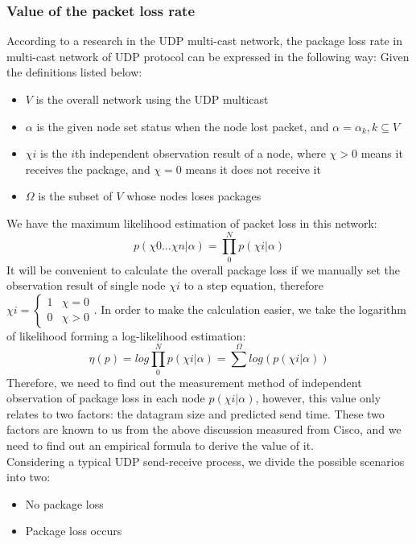 \documentclass[11pt,openright,a4paper]{report}
\begin{document}
\subsubsection{Value of the packet loss rate}
According to a research in the UDP multi-cast network, the package loss rate in multi-cast network of UDP protocol can be expressed in the following way\cite{caceres1999multicast}:
Given the definitions listed below:
\begin{itemize}
	\item $V$ is the overall network using the UDP multicast
	\item $\alpha$ is the given node set status when the node lost packet, and $\alpha = \alpha_{k},k\subseteq V$
	\item $\chi{i}$ is the $i$th independent observation result of a node, where $\chi > 0$ means it receives the package, and $\chi =0$ means it does not receive it
	\item $\Omega$ is the subset of $V$ whose nodes loses packages
\end{itemize} 
We have the maximum likelihood estimation of packet loss in this network:
\begin{equation}
	p(\chi{0}...\chi{n}|\alpha)=\prod_{0}^{N}p(\chi{i}|\alpha)
\end{equation}
It will be convenient to calculate the overall package loss if we manually set the observation result of single node $\chi{i}$ to a step equation, therefore $\chi{i}=\begin{cases}1 & \chi = 0 \\ 0 & \chi > 0\end{cases}$. In order to make the calculation easier, we take the logarithm of likelihood forming a log-likelihood estimation:
\begin{equation}
	\eta(p)=log\prod_{0}^{N}p(\chi{i}|\alpha)=\sum^{\Omega}log(p(\chi{i}|\alpha))
\end{equation} 
Therefore, we need to find out the measurement method of independent observation of package loss in each node $p(\chi{i}|\alpha)$, however, this value only relates to two factors: the datagram size and predicted send time. These two factors are known to us from the above discussion measured from Cisco, and we need to find out an empirical formula to derive the value of it.\\
Considering a typical UDP send-receive process, we divide the possible scenarios into two:
\begin{itemize}
	\item No package loss
	\item Package loss occurs
\end{itemize}
\end{document}
